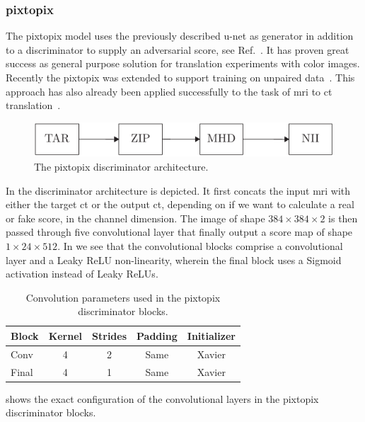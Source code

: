 \subsubsection{pixtopix}

The pixtopix model uses the previously described u-net as generator in
addition to a discriminator to supply an adversarial score, see
Ref.~\cite{Isola16}. It has proven great success as general purpose solution
for translation experiments with color images. Recently the pixtopix was
extended to support training on unpaired data~\cite{Zhu2017}. This approach
has also already been applied successfully to the task of \gls{mri} to
\gls{ct} translation~\cite{Wolterink17}.
\begin{figure}[h]
  \centering
  \includegraphics[page=4,width=\linewidth]{figure/diagrams.pdf}
  \caption{The pixtopix discriminator architecture.
	}\label{fig:pixtopix:disc}
\end{figure}
In  the discriminator architecture is depicted. It
first concats the input \gls{mri} with either the target \gls{ct} or the
output \gls{ct}, depending on if we want to calculate a real or fake score,
in the channel dimension. The image of shape $384\times384\times2$ is then
passed through five convolutional layer that finally output a score map of
shape $1\times24\times512$.
In  we see that the convolutional blocks comprise
a convolutional layer and a Leaky ReLU non-linearity, wherein the final block
uses a Sigmoid activation instead of Leaky ReLUs.
\begin{table}[h]
  \centering
  \begin{tabular}{lcccc}
    \toprule
    Block & Kernel & Strides & Padding & Initializer \\
    \midrule
    Conv & \num{4} & \num{2} & Same & Xavier \\
    Final  & \num{4} & \num{1} & Same & Xavier \\
    \bottomrule
  \end{tabular}
  \caption{Convolution parameters used in the pixtopix discriminator blocks.
  }\label{tab:pixtopix:conv}
\end{table}
 shows the exact configuration of the convolutional
layers in the pixtopix discriminator blocks.

